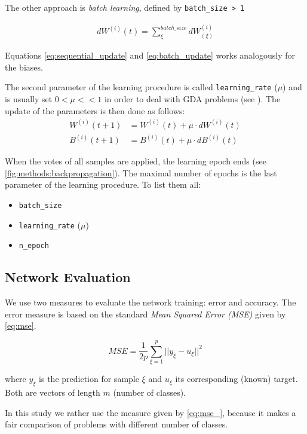 \begin{enumerate}
The other approach is \textit{batch learning}, defined by \texttt{batch\_size > 1}

\begin{align} \label{eq:batch_update}
dW^{(i)}(t) = \displaystyle{\sum_{\xi}^{batch\_size} dW^{(i)}_{(\xi)}}
\end{align}

Equations \ref{eq:sequential_update} and \ref{eq:batch_update} works analogously for the biases.

The second parameter of the learning procedure is called \texttt{learning\_rate} ($ \mu $) and is usually set $ 0 < \mu << 1 $ in order to deal with GDA problems (see \citep{online:nnanddl}). The update of the parameters is then done as follows:
\begin{align} \label{eq:params_update}
W^{(i)} (t+1) &= W^{(i)} (t) + \mu \cdot dW^{(i)} (t) \\ 
B^{(i)} (t+1) &= B^{(i)} (t) + \mu \cdot dB^{(i)} (t)
\end{align}
\end{enumerate}

When the votes of all samples are applied, the learning epoch ends (see \cref{fig:methods:backpropagation}). The maximal number of epochs is the last parameter of the learning procedure. To list them all:

\begin{itemize}
\item \texttt{batch\_size}
\item \texttt{learning\_rate} ($ \mu $)
\item \texttt{n\_epoch}
\end{itemize}

\subsection*{Network Evaluation}
We use two measures to evaluate the network training: error and accuracy.
The error measure is based on the standard \textit{Mean Squared Error (MSE)} given by \cref{eq:mse}.

\begin{equation} \label{eq:mse}
MSE = \frac{1}{2 p} \displaystyle{\sum^{p}_{\xi=1} ||y_{\xi} - u_{\xi}||^2}
\end{equation}

where $ y_{\xi} $ is the prediction for sample $ \xi $ and $ u_{\xi} $ its corresponding (known) target. Both are vectors of length $ m $ (number of classes).

In this study we rather use the measure given by \cref{eq:mse_}, because it makes a fair comparison of problems with different number of classes.

